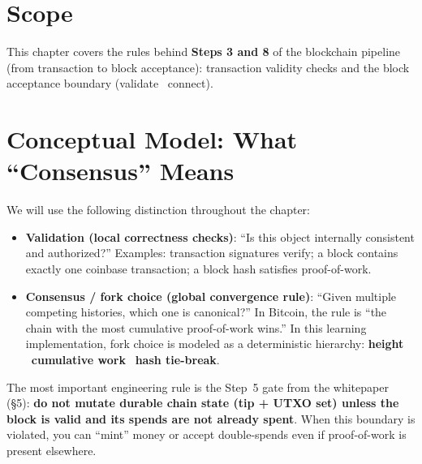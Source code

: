 \section{Scope}
\label{sec:ch09-7-scope}

This chapter covers the rules behind \textbf{Steps 3 and 8} of the blockchain pipeline (from transaction to block acceptance): transaction validity checks and the block acceptance boundary (validate \textrightarrow\ connect).

\section{Conceptual Model: What ``Consensus'' Means}
\label{sec:ch09-7-model}

We will use the following distinction throughout the chapter:

\begin{itemize}
  \item \textbf{Validation (local correctness checks)}: ``Is this object internally consistent and authorized?''
    Examples: transaction signatures verify; a block contains exactly one coinbase transaction; a block hash satisfies proof-of-work.

  \item \textbf{Consensus / fork choice (global convergence rule)}: ``Given multiple competing histories, which one is canonical?''
    In Bitcoin, the rule is ``the chain with the most cumulative proof-of-work wins.'' In this learning implementation, fork choice is modeled as a deterministic hierarchy: \textbf{height} \textrightarrow\ \textbf{cumulative work} \textrightarrow\ \textbf{hash tie-break}.
\end{itemize}

The most important engineering rule is the Step~5 gate from the whitepaper (\S5): \textbf{do not mutate durable chain state (tip + UTXO set) unless the block is valid and its spends are not already spent}. When this boundary is violated, you can ``mint'' money or accept double-spends even if proof-of-work is present elsewhere.

